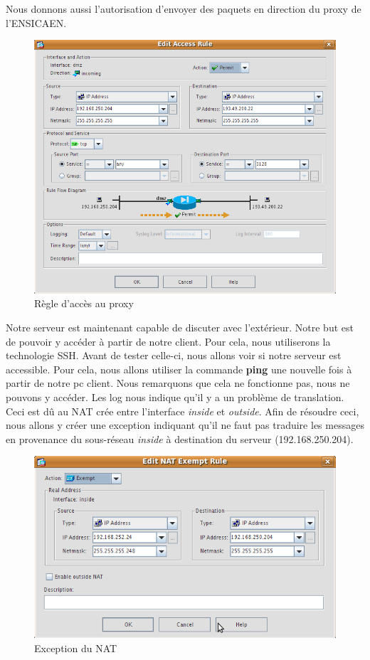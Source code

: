 \documentclass[a4paper,12pt]{article}
\begin{document}
Nous donnons aussi l'autorisation d'envoyer des paquets en direction du proxy de l'ENSICAEN.
\begin{figure}[H]
	\center
	\includegraphics[width=12cm]{img/15-policydmzproxy.png}
	\caption{Règle d'accès au proxy}
\end{figure}

Notre serveur est maintenant capable de discuter avec l'extérieur. Notre but est de pouvoir y accéder à partir de notre client. Pour cela, nous utiliserons 
la technologie SSH. Avant de tester celle-ci, nous allons voir si notre serveur est accessible. Pour cela, nous allons utiliser la commande \textbf{ping}
une nouvelle fois à partir de notre pc client. Nous remarquons que cela ne fonctionne pas, nous ne pouvons y accéder. Les log nous indique qu'il y a un problème
de translation. Ceci est dû au NAT crée entre l'interface \textit{inside} et \textit{outside}. Afin de résoudre ceci, nous allons y créer une exception indiquant
qu'il ne faut pas traduire les messages en provenance du sous-réseau \textit{inside} à destination du serveur (192.168.250.204).

\begin{figure}[H]
	\center
	\includegraphics[width=12cm]{img/16-natexception.png}
	\caption{Exception du NAT}
\end{figure}
\end{document}
